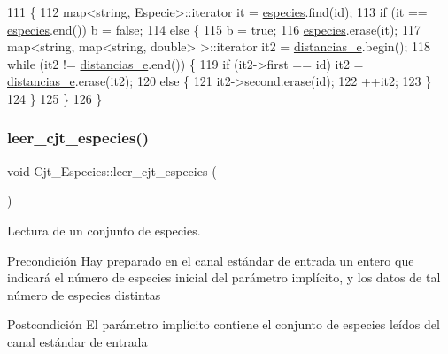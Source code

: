 \begin{DoxyCode}
111                                                              \{
112   map<string, Especie>::iterator it = \hyperlink{class_cjt___especies_a8f319699bd2e8a42b85ec47b67c17563}{especies}.find(\textcolor{keywordtype}{id});
113   \textcolor{keywordflow}{if} (it == \hyperlink{class_cjt___especies_a8f319699bd2e8a42b85ec47b67c17563}{especies}.end()) b = \textcolor{keyword}{false};
114   \textcolor{keywordflow}{else} \{
115     b = \textcolor{keyword}{true};
116     \hyperlink{class_cjt___especies_a8f319699bd2e8a42b85ec47b67c17563}{especies}.erase(it);
117     map<string, map<string, double> >::iterator it2 = \hyperlink{class_cjt___especies_ad1c8837b7e76b9a7610b65209aa7f5e9}{distancias\_e}.begin();
118     \textcolor{keywordflow}{while} (it2 != \hyperlink{class_cjt___especies_ad1c8837b7e76b9a7610b65209aa7f5e9}{distancias\_e}.end()) \{
119       \textcolor{keywordflow}{if} (it2->first == \textcolor{keywordtype}{id}) it2 = \hyperlink{class_cjt___especies_ad1c8837b7e76b9a7610b65209aa7f5e9}{distancias\_e}.erase(it2);
120       \textcolor{keywordflow}{else} \{
121         it2->second.erase(\textcolor{keywordtype}{id});
122         ++it2;
123       \}
124     \}
125   \}
126 \}
\end{DoxyCode}
\mbox{\label{class_cjt___especies_ace9e160297bf1ab372795594fed08fcc}} 
\subsubsection{\texorpdfstring{leer\+\_\+cjt\+\_\+especies()}{leer\_cjt\_especies()}}
{\footnotesize\ttfamily void Cjt\+\_\+\+Especies\+::leer\+\_\+cjt\+\_\+especies (\begin{DoxyParamCaption}{ }\end{DoxyParamCaption})}



Lectura de un conjunto de especies. 

\begin{DoxyPrecond}{Precondición}
Hay preparado en el canal estándar de entrada un entero que indicará el número de especies inicial del parámetro implícito, y los datos de tal número de especies distintas 
\end{DoxyPrecond}
\begin{DoxyPostcond}{Postcondición}
El parámetro implícito contiene el conjunto de especies leídos del canal estándar de entrada 
\end{DoxyPostcond}


